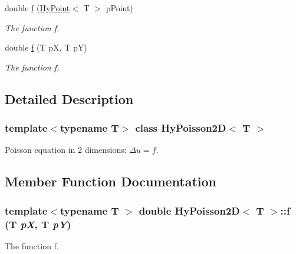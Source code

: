 \begin{DoxyCompactItemize}
\item 
double \hyperlink{classHyPoisson2D_ace05fcef4dbe0fe29c1357f7b0eeed23}{f} (\hyperlink{classHyPoint}{HyPoint}$<$ T $>$ pPoint)
\begin{DoxyCompactList}\small\item\em The function f. \item\end{DoxyCompactList}\item 
double \hyperlink{classHyPoisson2D_a8d4e172777a6adaa792d61f86b480e08}{f} (T pX, T pY)
\begin{DoxyCompactList}\small\item\em The function f. \item\end{DoxyCompactList}\end{DoxyCompactItemize}


\subsection{Detailed Description}
\subsubsection*{template$<$typename T$>$ class HyPoisson2D$<$ T $>$}

Poisson equation in 2 dimensions: $ \Delta u = f $. 

\subsection{Member Function Documentation}
\hypertarget{classHyPoisson2D_a8d4e172777a6adaa792d61f86b480e08}{
\subsubsection[{f}]{\setlength{\rightskip}{0pt plus 5cm}template$<$typename T $>$ double {\bf HyPoisson2D}$<$ T $>$::f (T {\em pX}, \/  T {\em pY})}}
\label{classHyPoisson2D_a8d4e172777a6adaa792d61f86b480e08}


The function f. 


